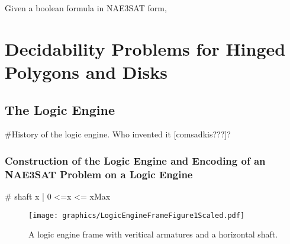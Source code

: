 Given a boolean formula in NAE3SAT form, 

\chapter{Decidability Problems for Hinged Polygons and Disks}
\section{The Logic Engine}
#History of the logic engine.  Who invented it [comsadkis???]?
\subsection{Construction of the Logic Engine and Encoding of an NAE3SAT Problem on a Logic 
Engine}

# shaft {x | 0 <=x <= xMax}


\begin{figure}[!h]
\begin{center}
\texttt{[image: graphics/LogicEngineFrameFigure1Scaled.pdf]}
\caption{A logic engine frame with veritical armatures and a horizontal 
shaft.}\label{fig:LogicEngineFrameFigure1.pdf}
\end{center}
\end{figure}


